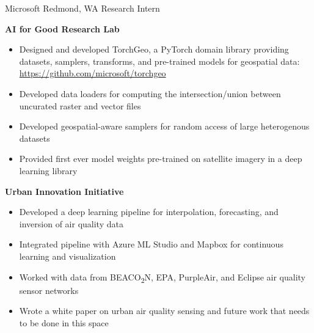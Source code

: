 
        {Microsoft}
        {Redmond, WA}
        {Research Intern}
        {}{
    \textbf{AI for Good Research Lab}
    \begin{itemize}
        \item Designed and developed TorchGeo, a PyTorch domain library providing datasets, samplers, transforms, and pre-trained models for geospatial data: \url{https://github.com/microsoft/torchgeo}
        \item Developed data loaders for computing the intersection/union between uncurated raster and vector files
        \item Developed geospatial-aware samplers for random access of large heterogenous datasets
        \item Provided first ever model weights pre-trained on satellite imagery in a deep learning library
    \end{itemize}
    \textbf{Urban Innovation Initiative}
    \begin{itemize}
        \item Developed a deep learning pipeline for interpolation, forecasting, and inversion of air quality data
        \item Integrated pipeline with Azure ML Studio and Mapbox for continuous learning and visualization
        \item Worked with data from BEACO\textsubscript{2}N, EPA, PurpleAir, and Eclipse air quality sensor networks
        \item Wrote a white paper on urban air quality sensing and future work that needs to be done in this space
    \end{itemize}
}